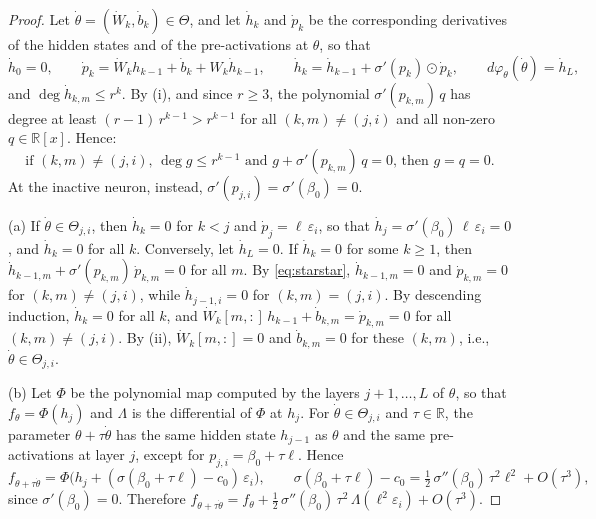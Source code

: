 \documentclass[11pt]{article}
\theoremstyle{definition}
\theoremstyle{remark}
\newcommand{\R}{\mathbb{R}}
\begin{document}
\begin{proof}
Let $\dot\theta=(\dot W_k,\dot b_k)\in\Theta$, and let $\dot h_k$ and $\dot p_k$ be the corresponding derivatives of the hidden states and of the pre-activations at $\theta$, so that
\[
\dot h_0=0,\qquad\dot p_k=\dot W_kh_{k-1}+\dot b_k+W_k\dot h_{k-1},\qquad\dot h_k=\dot h_{k-1}+\sigma'(p_k)\odot\dot p_k,\qquad d\varphi_\theta(\dot\theta)=\dot h_L,
\]
and $\deg\dot h_{k,m}\le r^k$. By (i), and since $r\ge3$, the polynomial $\sigma'(p_{k,m})\,q$ has degree at least $(r-1)\,r^{k-1}>r^{k-1}$ for all $(k,m)\ne(j,i)$ and all non-zero $q\in\R[x]$. Hence:
\begin{equation*}\tag{$\ast\ast$}\label{eq:starstar}
\text{if $(k,m)\ne(j,i)$, $\deg g\le r^{k-1}$ and $g+\sigma'(p_{k,m})\,q=0$, then $g=q=0$.}
\end{equation*}
At the inactive neuron, instead, $\sigma'(p_{j,i})=\sigma'(\beta_0)=0$.

(a) If $\dot\theta\in\Theta_{j,i}$, then $\dot h_k=0$ for $k<j$ and $\dot p_j=\ell\,\varepsilon_i$, so that $\dot h_j=\sigma'(\beta_0)\,\ell\,\varepsilon_i=0$, and $\dot h_k=0$ for all $k$. Conversely, let $\dot h_L=0$. If $\dot h_k=0$ for some $k\ge1$, then $\dot h_{k-1,m}+\sigma'(p_{k,m})\,\dot p_{k,m}=0$ for all $m$. By \eqref{eq:starstar}, $\dot h_{k-1,m}=0$ and $\dot p_{k,m}=0$ for $(k,m)\ne(j,i)$, while $\dot h_{j-1,i}=0$ for $(k,m)=(j,i)$. By descending induction, $\dot h_k=0$ for all $k$, and $\dot W_k[m,:]\,h_{k-1}+\dot b_{k,m}=\dot p_{k,m}=0$ for all $(k,m)\ne(j,i)$. By (ii), $\dot W_k[m,:]=0$ and $\dot b_{k,m}=0$ for these $(k,m)$, i.e., $\dot\theta\in\Theta_{j,i}$.

(b) Let $\Phi$ be the polynomial map computed by the layers $j+1,\dots,L$ of $\theta$, so that $f_\theta=\Phi(h_j)$ and $\Lambda$ is the differential of $\Phi$ at $h_j$. For $\dot\theta\in\Theta_{j,i}$ and $\tau\in\R$, the parameter $\theta+\tau\dot\theta$ has the same hidden state $h_{j-1}$ as $\theta$ and the same pre-activations at layer $j$, except for $p_{j,i}=\beta_0+\tau\ell$. Hence
\[
f_{\theta+\tau\dot\theta}=\Phi\big(h_j+(\sigma(\beta_0+\tau\ell)-c_0)\,\varepsilon_i\big),\qquad\sigma(\beta_0+\tau\ell)-c_0=\tfrac12\,\sigma''(\beta_0)\,\tau^2\ell^2+O(\tau^3),
\]
since $\sigma'(\beta_0)=0$. Therefore $f_{\theta+\tau\dot\theta}=f_\theta+\frac12\,\sigma''(\beta_0)\,\tau^2\,\Lambda(\ell^2\varepsilon_i)+O(\tau^3)$.


\end{proof}
\end{document}
